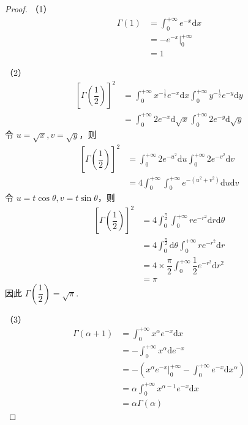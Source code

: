 \begin{proof}
    （1）
    $$
    \begin{aligned}
        \Gamma(1) &= \int_{0}^{+\infty} e^{-x} \text{d}x \\
        &= -e^{-x} \Big|_0^{+\infty} \\
        &= 1
    \end{aligned}
    $$

    （2）
    $$
    \begin{aligned}
        \left[ \Gamma(\dfrac{1}{2}) \right]^2 &= \int_{0}^{+\infty} x^{-\frac{1}{2}} e^{-x} \text{d}x \int_{0}^{+\infty} y^{-\frac{1}{2}} e^{-y} \text{d}y \\
        &= \int_{0}^{+\infty} 2 e^{-x} \text{d} \sqrt{x} \int_{0}^{+\infty} 2 e^{-y} \text{d} \sqrt{y}
    \end{aligned}
    $$
    令 $u = \sqrt{x}, v = \sqrt{y}$，则
    $$
    \begin{aligned}
        \left[ \Gamma(\dfrac{1}{2}) \right]^2 &= \int_{0}^{+\infty} 2 e^{-u^2} \text{d}u \int_{0}^{+\infty} 2 e^{-v^2} \text{d}v \\
        &= 4 \int_{0}^{+\infty} \int_{0}^{+\infty} e^{-(u^2 + v^2)} \text{d}u \text{d}v
    \end{aligned}
    $$
    令 $u = t \cos\theta, v = t \sin\theta$，则
    $$
    \begin{aligned}
        \left[ \Gamma(\dfrac{1}{2}) \right]^2 &= 4 \int_{0}^{\frac{\pi}{2}} \int_{0}^{+\infty} r e^{-r^2} \text{d}r \text{d} \theta \\
        &= 4 \int_{0}^{\frac{\pi}{2}} \text{d} \theta \int_{0}^{+\infty} r e^{-r^2} \text{d}r \\
        &= 4 \times \dfrac{\pi}{2} \int_{0}^{+\infty} \dfrac{1}{2} e^{-r^2} \text{d}r^2 \\
        &= \pi
    \end{aligned}
    $$
    因此 $\Gamma(\dfrac{1}{2}) = \sqrt{\pi}$.

    （3）
    $$
    \begin{aligned}
        \Gamma(\alpha + 1) &= \int_{0}^{+\infty} x^{\alpha} e^{-x} \text{d}x \\
        &= -\int_{0}^{+\infty} x^{\alpha} \text{d} e^{-x} \\
        &= -\left( x^{\alpha} e^{-x} \Big|_0^{+\infty} - \int_{0}^{+\infty} e^{-x} \text{d} x^{\alpha} \right) \\
        &= \alpha \int_{0}^{+\infty} x^{\alpha - 1} e^{-x} \text{d}x \\
        &= \alpha \Gamma(\alpha)
    \end{aligned}
    $$

    \vspace{-1.5em}
\end{proof}

